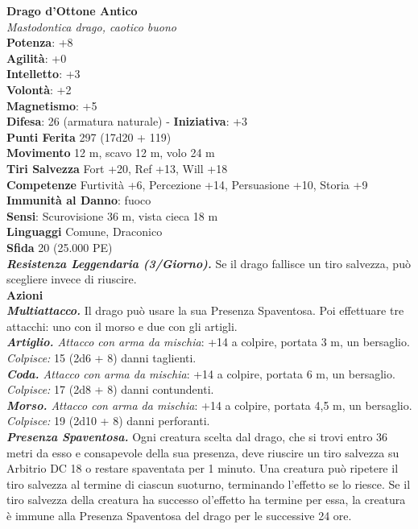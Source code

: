 \begin{multicols}{2}
\medskip\textbf{Drago d'Ottone Antico}\\
\emph{Mastodontica drago, caotico buono}\\
\textbf{Potenza}: +8\\
\textbf{Agilità}: +0\\
\textbf{Intelletto}: +3\\
\textbf{Volontà}: +2\\
\textbf{Magnetismo}: +5\\
\textbf{Difesa}: 26 (armatura naturale) - \textbf{Iniziativa}: +3\\
\textbf{Punti Ferita} 297 (17d20 + 119)\\
\textbf{Movimento} 12 m, scavo 12 m, volo 24 m\\
\textbf{Tiri Salvezza} Fort +20, Ref +13, Will +18\\
\textbf{Competenze} Furtività +6, Percezione +14, Persuasione +10, Storia +9\\
\textbf{Immunità al Danno}: fuoco\\
\textbf{Sensi}: Scurovisione 36 m, vista cieca 18 m\\
\textbf{Linguaggi} Comune, Draconico\\
\textbf{Sfida} 20 (25.000 PE)\smallskip\\
\emph{\textbf{Resistenza Leggendaria (3/Giorno).}} Se il drago fallisce un tiro salvezza, può scegliere invece di riuscire.\\
\smallskip\textbf{Azioni}\\
\emph{\textbf{Multiattacco.}} Il drago può usare la sua Presenza Spaventosa. Poi effettuare tre attacchi: uno con il morso e due con gli artigli.\\
\emph{\textbf{Artiglio.} Attacco con arma da mischia}: +14 a colpire, portata 3 m, un bersaglio.\\
\emph{Colpisce:} 15 (2d6 + 8) danni taglienti.\\
\emph{\textbf{Coda.} Attacco con arma da mischia}: +14 a colpire, portata 6 m, un bersaglio.\\
\emph{Colpisce:} 17 (2d8 + 8) danni contundenti.\\
\emph{\textbf{Morso.} Attacco con arma da mischia}: +14 a colpire, portata 4,5 m, un bersaglio.\\
\emph{Colpisce:} 19 (2d10 + 8) danni perforanti.\\
\emph{\textbf{Presenza Spaventosa.}} Ogni creatura scelta dal drago, che si trovi entro 36 metri da esso e consapevole della sua presenza, deve riuscire un tiro salvezza su Arbitrio DC 18 o restare spaventata per 1 minuto. Una creatura può ripetere il tiro salvezza al termine di ciascun suoturno,  terminando l'effetto se lo riesce. Se il tiro salvezza della creatura ha successo ol'effetto ha termine per essa, la creatura è  immune alla Presenza Spaventosa del drago per le successive 24 ore.\\

\end{multicols}
